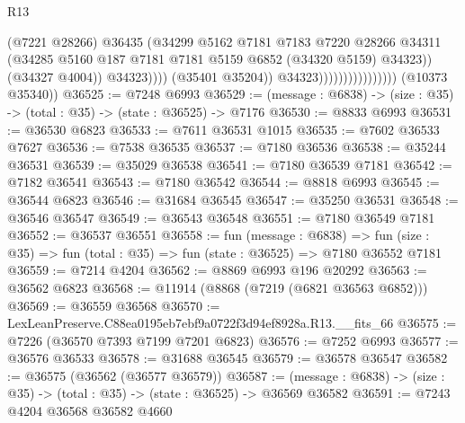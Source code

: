 \begin{lexlean}{R13}
\begin{coremodule}
                                                  (@7221 @28266)
                                                  @36435
                                                  (@34299
                                                    @5162
                                                    @7181
                                                    @7183
                                                    @7220
                                                    @28266
                                                    @34311
                                                    (@34285
                                                      @5160
                                                      @187
                                                      @7181
                                                      @7181
                                                      @5159
                                                      @6852
                                                      (@34320 @5159)
                                                      @34323))
                                                  (@34327 @4004))
                                                @34323))))
                                        (@35401 @35204))
                                      @34323))))))))))))))))
      (@10373 @35340))
@36525 := @7248 @6993
@36529 := (message : @6838) -> (size : @35) -> (total : @35) -> (state : @36525) -> @7176
@36530 := @8833 @6993
@36531 := @36530 @6823
@36533 := @7611 @36531 @1015
@36535 := @7602 @36533 @7627
@36536 := @7538 @36535
@36537 := @7180 @36536
@36538 := @35244 @36531
@36539 := @35029 @36538
@36541 := @7180 @36539 @7181
@36542 := @7182 @36541
@36543 := @7180 @36542
@36544 := @8818 @6993
@36545 := @36544 @6823
@36546 := @31684 @36545
@36547 := @35250 @36531
@36548 := @36546 @36547
@36549 := @36543 @36548
@36551 := @7180 @36549 @7181
@36552 := @36537 @36551
@36558 := fun (message : @6838) =>
  fun (size : @35) => fun (total : @35) => fun (state : @36525) => @7180 @36552 @7181
@36559 := @7214 @4204
@36562 := @8869 @6993 @196 @20292
@36563 := @36562 @6823
@36568 := @11914 (@8868 (@7219 (@6821 @36563 @6852)))
@36569 := @36559 @36568
@36570 := LexLeanPreserve.C88ea0195eb7ebf9a0722f3d94ef8928a.R13.__fits_66
@36575 := @7226 (@36570 @7393 @7199 @7201 @6823)
@36576 := @7252 @6993
@36577 := @36576 @36533
@36578 := @31688 @36545
@36579 := @36578 @36547
@36582 := @36575 (@36562 (@36577 @36579))
@36587 := (message : @6838) -> (size : @35) -> (total : @35) -> (state : @36525) -> @36569 @36582
@36591 := @7243 @4204 @36568 @36582 @4660

\end{coremodule}
\end{lexlean}
